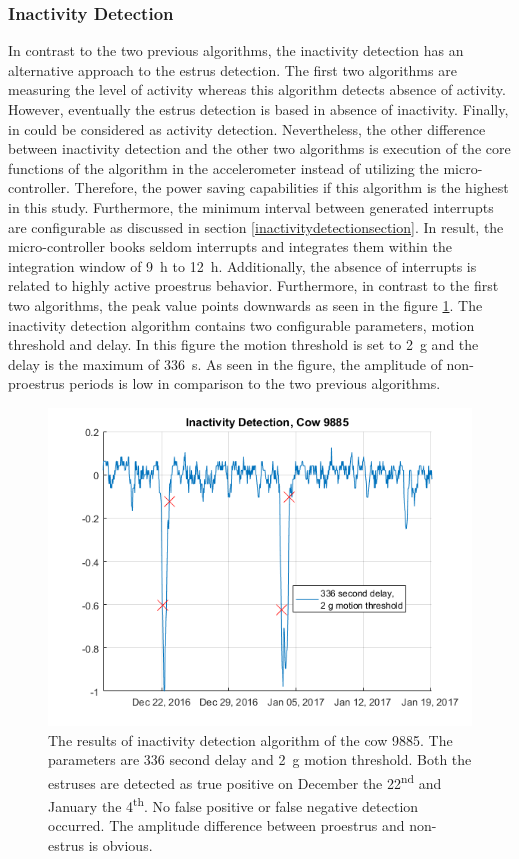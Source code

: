\documentclass[english,12pt,a4paper,pdftex,elec,utf8]{aaltothesis}
\begin{document}
\subsubsection{Inactivity Detection}\label{inactivitydetectionevaluation}

In contrast to the two previous algorithms, the inactivity detection has an alternative approach to the estrus detection. The first two algorithms are measuring the level of activity whereas this algorithm detects absence of activity. However, eventually the estrus detection is based in absence of inactivity. Finally, in could be considered as activity detection. Nevertheless, the other difference between inactivity detection and the other two algorithms is execution of the core functions of the algorithm in the accelerometer instead of utilizing the micro-controller. Therefore, the power saving capabilities if this algorithm is the highest in this study. Furthermore, the minimum interval between generated interrupts are configurable as discussed in section \ref{inactivitydetectionsection}. In result, the micro-controller books seldom interrupts and integrates them within the integration window of \SI{9}{\hour} to \SI{12}{\hour}. Additionally, the absence of interrupts is related to highly active proestrus behavior. Furthermore, in contrast to the first two algorithms, the peak value points downwards as seen in the figure \ref{InactivityDetectionCow9885}. The inactivity detection algorithm contains two configurable parameters, motion threshold and delay. In this figure the motion threshold is set to \SI{2}{\gram} and the delay is the maximum of \SI{336}{s}. As seen in the figure, the amplitude of non-proestrus periods is low in comparison to the two previous algorithms.


\begin{figure}[htb]
\centering
\includegraphics[width = 0.75 \textwidth]{figures/InactivityDetectionCow9885.png}
\caption{The results of inactivity detection algorithm of the cow 9885. The parameters are 336 second delay and \SI{2}{\gram} motion threshold. Both the estruses are detected as true positive on December the 22\textsuperscript{nd} and January the 4\textsuperscript{th}. No false positive or false negative detection occurred. The amplitude difference between proestrus and non-estrus is obvious.}
\label{InactivityDetectionCow9885}
\end{figure}
\end{document}
